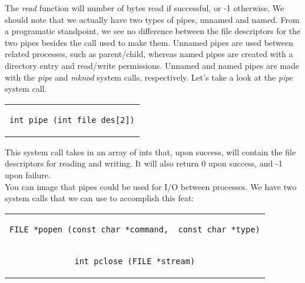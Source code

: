 \documentclass{article}
\begin{document}
\indent The \textit{read} function will number of bytes read if successful, or -1 otherwise. We should note that we actually have two types of pipes, unnamed and named. From a programatic standpoint, we see no difference between the file descriptors for the two pipes besides the call used to make them. Unnamed pipes are used between related processes, such as parent/child, whereas named pipes are created with a directory entry and read/write permissions. Unnamed and named pipes are made with the \textit{pipe} and \textit{mknod} system calls, respectively. Let's take a look at the \textit{pipe} system call.
\begin{center} 
\begin{tabular}{c}
\begin{lstlisting}
int pipe (int file_des[2])
\end{lstlisting}
\end{tabular}
\end{center}
\indent This system call takes in an array of ints that, upon success, will contain the file descriptors for reading and writing. It will also return 0 upon success, and -1 upon failure.\\
\indent You can image that pipes could be used for I/O between processes. We have two system calls that we can use to accomplish this feat:
 \begin{center} 
\begin{tabular}{c}
\begin{lstlisting}
FILE *popen (const char *command,  const char *type)
\end{lstlisting}\\
\begin{lstlisting}
int pclose (FILE *stream)
\end{lstlisting}
\end{tabular}
\end{center}
\end{document}
